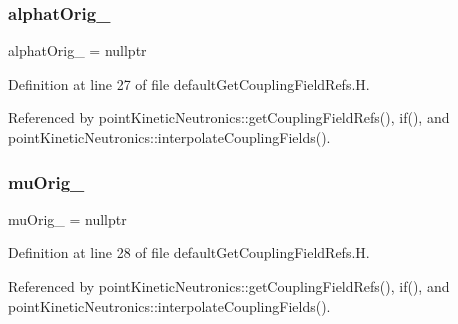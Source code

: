 \subsubsection{\texorpdfstring{alphat\+Orig\+\_\+}{alphatOrig\_}}
{\footnotesize\ttfamily alphat\+Orig\+\_\+ = nullptr}



Definition at line 27 of file default\+Get\+Coupling\+Field\+Refs.\+H.



Referenced by point\+Kinetic\+Neutronics\+::get\+Coupling\+Field\+Refs(), if(), and point\+Kinetic\+Neutronics\+::interpolate\+Coupling\+Fields().

\mbox{\label{defaultGetCouplingFieldRefs_8H_ace5c6d916116c439b30ff3c9311eac1e}} 
\subsubsection{\texorpdfstring{mu\+Orig\+\_\+}{muOrig\_}}
{\footnotesize\ttfamily mu\+Orig\+\_\+ = nullptr}



Definition at line 28 of file default\+Get\+Coupling\+Field\+Refs.\+H.



Referenced by point\+Kinetic\+Neutronics\+::get\+Coupling\+Field\+Refs(), if(), and point\+Kinetic\+Neutronics\+::interpolate\+Coupling\+Fields().

